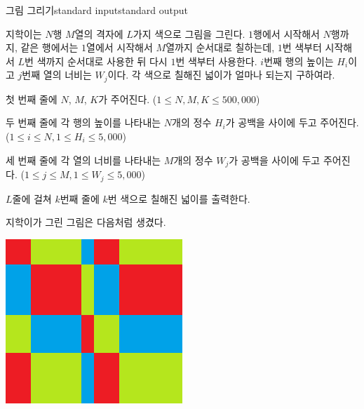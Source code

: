 \begin{problem}{그림 그리기}{standard input}{standard output}

지학이는 $N$행 $M$열의 격자에 $L$가지 색으로 그림을 그린다. $1$행에서 시작해서 $N$행까지, 같은 행에서는 $1$열에서 시작해서 $M$열까지 순서대로 칠하는데, $1$번 색부터 시작해서 $L$번 색까지 순서대로 사용한 뒤 다시 $1$번 색부터 사용한다. $i$번째 행의 높이는 $H_i$이고 $j$번째 열의 너비는 $W_j$이다. 각 색으로 칠해진 넓이가 얼마나 되는지 구하여라.

\InputFile
첫 번째 줄에 $N$, $M$, $K$가 주어진다. ($1 \le N, M, K \le 500,000$)

두 번째 줄에 각 행의 높이를 나타내는 $N$개의 정수 $H_i$가 공백을 사이에 두고 주어진다. ($1 \le i \le N, 1 \le H_i \le 5,000$)

세 번째 줄에 각 열의 너비를 나타내는 $M$개의 정수 $W_j$가 공백을 사이에 두고 주어진다. ($1 \le j \le M, 1 \le W_j \le 5,000$)

\OutputFile
$L$줄에 걸쳐 $k$번째 줄에 $k$번 색으로 칠해진 넓이를 출력한다.

\Example

\begin{example}
%
\end{example}

\Notes

지학이가 그린 그림은 다음처럼 생겼다.

\begin{center}
  \includegraphics[width=0.5\textwidth]{picture.png}
\end{center}

\end{problem}
